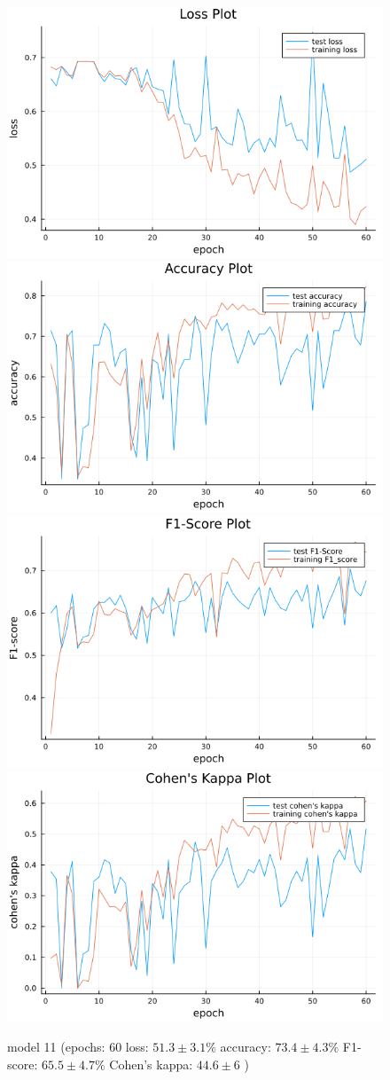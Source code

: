 \documentclass[
a4paper, 
12pt,
grayscalebody, %
abstract=on,
twoside, BCOR10mm, 12pt, DIV13,headinclude, footexclude, final, abstracton, openright
]{ibireprt}
\numberwithin{equation}{chapter}
\numberwithin{table}{chapter}
\numberwithin{figure}{chapter}
\numberwithin{algorithm}{chapter}
\numberwithin{example}{chapter}
\numberwithin{example}{chapter}
\begin{document}
\begin{figure}[h]
	\includegraphics[width=0.4\linewidth]{loss_png_13_1.png}\hfill
	\includegraphics[width=0.4\linewidth]{accuracy_png_13_1.png}
	\\[\smallskipamount]
	\includegraphics[width=0.4\linewidth]{f1_score_png_13_1.png}\hfill
	\includegraphics[width=0.4\linewidth]{cohens_kappa_png_13_1.png}
	\caption{model 11 (epochs: 60 loss: $51.3\pm3.1\% $ accuracy: $73.4\pm4.3\%$ F1-score: $65.5\pm4.7\%$  Cohen's kappa: $44.6\pm6$ )}
\end{figure}

\end{document}

